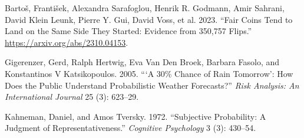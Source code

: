 \documentclass[
  letterpaper,
  DIV=11,
  numbers=noendperiod]{scrreprt}
\newlength{\cslhangindent}
\newenvironment{CSLReferences}[2] %
 {\begin{list}{}{%
  \setlength{\itemindent}{0pt}
  \setlength{\leftmargin}{0pt}
  \setlength{\parsep}{0pt}
  \ifodd #1
   \setlength{\leftmargin}{\cslhangindent}
   \setlength{\itemindent}{-1\cslhangindent}
  \fi
  \setlength{\itemsep}{#2\baselineskip}}}
 {\end{list}}
\theoremstyle{definition}
\theoremstyle{definition}
\theoremstyle{definition}
\theoremstyle{remark}
\begin{document}
\label{refs}
\begin{CSLReferences}{1}{0}
Bartoš, František, Alexandra Sarafoglou, Henrik R. Godmann, Amir
Sahrani, David Klein Leunk, Pierre Y. Gui, David Voss, et al. 2023.
{``Fair Coins Tend to Land on the Same Side They Started: Evidence from
350,757 Flips.''} \url{https://arxiv.org/abs/2310.04153}.

Gigerenzer, Gerd, Ralph Hertwig, Eva Van Den Broek, Barbara Fasolo, and
Konstantinos V Katsikopoulos. 2005. {``{`A 30\% Chance of Rain
Tomorrow'}: How Does the Public Understand Probabilistic Weather
Forecasts?''} \emph{Risk Analysis: An International Journal} 25 (3):
623--29.

Kahneman, Daniel, and Amos Tversky. 1972. {``Subjective Probability: A
Judgment of Representativeness.''} \emph{Cognitive Psychology} 3 (3):
430--54.

\end{CSLReferences}
\end{document}
